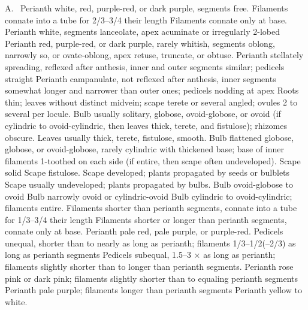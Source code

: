 \documentclass{ctexart}
\begin{document}
\begin{Key*}{A.~}
\alter Perianth white, red, purple-red, or dark purple, segments free.
\alter Filaments connate into a tube for 2/3--3/4 their length
\alter Filaments connate only at base.
\alter Perianth white, segments lanceolate, apex acuminate or irregularly 2-lobed
\alter Perianth red, purple-red, or dark purple, rarely whitish, segments oblong, narrowly so, or ovate-oblong, apex retuse, truncate, or obtuse.
\alter Perianth stellately spreading, reflexed after anthesis, inner and outer segments similar; pedicels straight
\alter Perianth campanulate, not reflexed after anthesis, inner segments somewhat longer and narrower than outer ones; pedicels nodding at apex
\alter Roots thin; leaves without distinct midvein; scape terete or several angled; ovules 2 to several per locule.
\alter Bulb usually solitary, globose, ovoid-globose, or ovoid (if cylindric to ovoid-cylindric, then leaves thick, terete, and fistulose); rhizomes obscure.
\alter Leaves usually thick, terete, fistulose, smooth.
\alter Bulb flattened globose, globose, or ovoid-globose, rarely cylindric with thickened base; base of inner filaments 1-toothed on each side (if entire, then scape often undeveloped).
\alter Scape solid
\alter Scape fistulose.
\alter Scape developed; plants propagated by seeds or bulblets
\alter Scape usually undeveloped; plants propagated by bulbs.
\alter Bulb ovoid-globose to ovoid
\alter Bulb narrowly ovoid or cylindric-ovoid
\alter Bulb cylindric to ovoid-cylindric; filaments entire.
\alter Filaments shorter than perianth segments, connate into a tube for 1/3--3/4 their length
\alter Filaments shorter or longer than perianth segments, connate only at base.
\alter Perianth pale red, pale purple, or purple-red.
\alter Pedicels unequal, shorter than to nearly as long as perianth; filaments 1/3--1/2(--2/3) as long as perianth segments
\alter Pedicels subequal, 1.5--3 × as long as perianth; filaments slightly shorter than to longer than perianth segments.
\alter Perianth rose pink or dark pink; filaments slightly shorter than to equaling perianth segments
\alter Perianth pale purple; filaments longer than perianth segments
\alter Perianth yellow to white.

\end{Key*}
\end{document}
